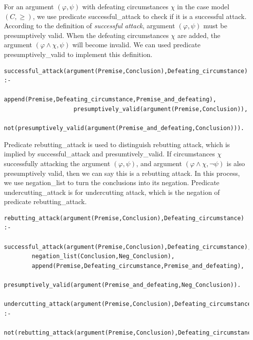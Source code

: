 \documentclass{IOS-Book-Article}
\begin{document}
For an argument $(\varphi, \psi)$ with defeating circumstances $\chi$ in the case model $(C, \geq)$, we use predicate {\mf successful\_attack} to check if it is a successful attack. According to the definition of \textit{successful attack}, argument $(\varphi, \psi)$ must be presumptively valid. When the defeating circumstances $\chi$ are added, the argument $(\varphi \wedge \chi, \psi)$ will become invalid. We can used predicate {\mf presumptively\_valid} to implement this definition.
\begin{lstlisting}
successful_attack(argument(Premise,Conclusion),Defeating_circumstance) :-
					append(Premise,Defeating_circumstance,Premise_and_defeating),
					presumptively_valid(argument(Premise,Conclusion)),
					not(presumptively_valid(argument(Premise_and_defeating,Conclusion))).
\end{lstlisting}

Predicate {\mf rebutting\_attack} is used to distinguish rebutting attack, which is implied by {\mf successful\_attack} and {\mf presumtively\_valid}. If circumstances $\chi$ successfully attacking the argument  $(\varphi, \psi)$, and argument $(\varphi \wedge \chi, \neg \psi)$ is also presumptively valid, then we can say this is a rebutting attack. In this process, we use {\mf negation\_list} to turn the conclusions into its negation. Predicate {\mf undercutting\_attack} is for undercutting attack, which is the negation of predicate {\mf rebutting\_attack}.
\begin{lstlisting}
rebutting_attack(argument(Premise,Conclusion),Defeating_circumstance) :-
		successful_attack(argument(Premise,Conclusion),Defeating_circumstance),
		negation_list(Conclusion,Neg_Conclusion),
		append(Premise,Defeating_circumstance,Premise_and_defeating),
		presumptively_valid(argument(Premise_and_defeating,Neg_Conclusion)).

undercutting_attack(argument(Premise,Conclusion),Defeating_circumstance) :-
		not(rebutting_attack(argument(Premise,Conclusion),Defeating_circumstance)).
\end{lstlisting}
\end{document}
